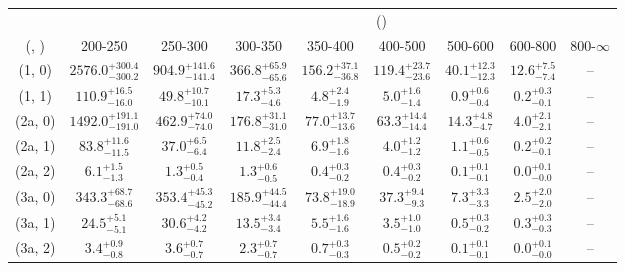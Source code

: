 \begin{table}[h!]
\tiny
\centering
{}
\begin{tabular}
{ccccccccc}
	\hline\hline
&	& \multicolumn{8}{c}{\scalht (\gev)} \\ 
	 (\njet,  \nb) & 200-250 & 250-300 & 300-350 & 350-400 & 400-500 & 500-600 & 600-800 & 800-$\infty$ \\ [0.8ex] 
\hline
	(1, 0) & $2576.0^{+ 300.4 }_{- 300.2 }$ & $904.9^{+ 141.6 }_{- 141.4 }$ & $366.8^{+ 65.9 }_{- 65.6 }$ & $156.2^{+ 37.1 }_{- 36.8 }$ & $119.4^{+ 23.7 }_{- 23.6 }$ & $40.1^{+ 12.3 }_{- 12.3 }$ & $12.6^{+ 7.5 }_{- 7.4 }$ & -- \\[0.5ex] 
	(1, 1) & $110.9^{+ 16.5 }_{- 16.0 }$ & $49.8^{+ 10.7 }_{- 10.1 }$ & $17.3^{+ 5.3 }_{- 4.6 }$ & $4.8^{+ 2.4 }_{- 1.9 }$ & $5.0^{+ 1.6 }_{- 1.4 }$ & $0.9^{+ 0.6 }_{- 0.4 }$ & $0.2^{+ 0.3 }_{- 0.1 }$ & -- \\[0.5ex] 
	(2a, 0) & $1492.0^{+ 191.1 }_{- 191.0 }$ & $462.9^{+ 74.0 }_{- 74.0 }$ & $176.8^{+ 31.1 }_{- 31.0 }$ & $77.0^{+ 13.7 }_{- 13.6 }$ & $63.3^{+ 14.4 }_{- 14.4 }$ & $14.3^{+ 4.8 }_{- 4.7 }$ & $4.0^{+ 2.1 }_{- 2.1 }$ & -- \\[0.5ex] 
	(2a, 1) & $83.8^{+ 11.6 }_{- 11.5 }$ & $37.0^{+ 6.5 }_{- 6.4 }$ & $11.8^{+ 2.5 }_{- 2.4 }$ & $6.9^{+ 1.8 }_{- 1.6 }$ & $4.0^{+ 1.2 }_{- 1.2 }$ & $1.1^{+ 0.6 }_{- 0.5 }$ & $0.2^{+ 0.2 }_{- 0.1 }$ & -- \\[0.5ex] 
	(2a, 2) & $6.1^{+ 1.5 }_{- 1.3 }$ & $1.3^{+ 0.5 }_{- 0.4 }$ & $1.3^{+ 0.6 }_{- 0.5 }$ & $0.4^{+ 0.3 }_{- 0.2 }$ & $0.4^{+ 0.3 }_{- 0.2 }$ & $0.1^{+ 0.1 }_{- 0.1 }$ & $0.0^{+ 0.1 }_{- 0.0 }$ & -- \\[0.5ex] 
	(3a, 0) & $343.3^{+ 68.7 }_{- 68.6 }$ & $353.4^{+ 45.3 }_{- 45.2 }$ & $185.9^{+ 44.5 }_{- 44.4 }$ & $73.8^{+ 19.0 }_{- 18.9 }$ & $37.3^{+ 9.4 }_{- 9.3 }$ & $7.3^{+ 3.3 }_{- 3.3 }$ & $2.5^{+ 2.0 }_{- 2.0 }$ & -- \\[0.5ex] 
	(3a, 1) & $24.5^{+ 5.1 }_{- 5.1 }$ & $30.6^{+ 4.2 }_{- 4.2 }$ & $13.5^{+ 3.4 }_{- 3.4 }$ & $5.5^{+ 1.6 }_{- 1.6 }$ & $3.5^{+ 1.0 }_{- 1.0 }$ & $0.5^{+ 0.3 }_{- 0.2 }$ & $0.3^{+ 0.3 }_{- 0.3 }$ & -- \\[0.5ex] 
	(3a, 2) & $3.4^{+ 0.9 }_{- 0.8 }$ & $3.6^{+ 0.7 }_{- 0.7 }$ & $2.3^{+ 0.7 }_{- 0.7 }$ & $0.7^{+ 0.3 }_{- 0.3 }$ & $0.5^{+ 0.2 }_{- 0.2 }$ & $0.1^{+ 0.1 }_{- 0.1 }$ & $0.0^{+ 0.1 }_{- 0.0 }$ & -- \\[0.5ex] 

\end{tabular}
\end{table}
